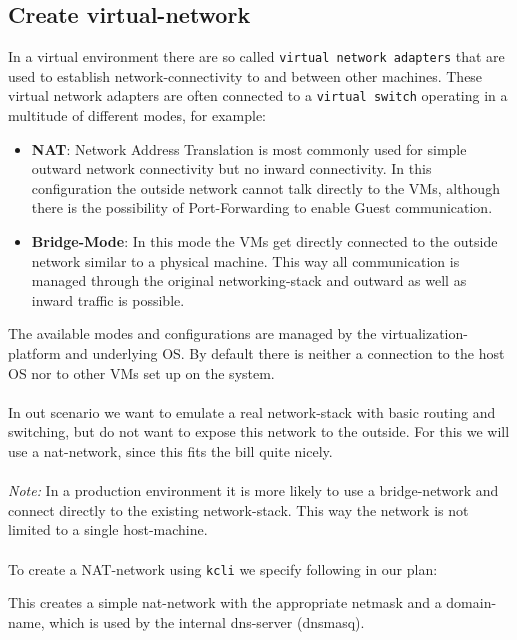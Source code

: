 \subsection{Create virtual-network}
In a virtual environment there are so called \texttt{virtual network adapters} that are used to establish network-connectivity to and between other machines. These virtual network adapters are often connected to a \texttt{virtual switch} operating in a multitude of different modes, for example:
\begin{itemize}
	\item \textbf{NAT}: Network Address Translation is most commonly used for simple outward network connectivity but no inward connectivity. In this configuration the outside network cannot talk directly to the VMs, although there is the possibility of Port-Forwarding to enable Guest communication.
	\item \textbf{Bridge-Mode}: In this mode the VMs get directly connected to the outside network similar to a physical machine. This way all communication is managed through the original networking-stack and outward as well as inward traffic is possible.
\end{itemize}
The available modes and configurations are managed by the virtualization-platform and underlying OS. By default there is neither a connection to the host OS nor to other VMs set up on the system. \cite{libvirt:2014}\\\\
In out scenario we want to emulate a real network-stack with basic routing and switching, but do not want to expose this network to the outside. For this we will use a nat-network, since this fits the bill quite nicely.\\\\
\textit{Note:} In a production environment it is more likely to use a bridge-network and connect directly to the existing network-stack. This way the network is not limited to a single host-machine.\\\\
To create a NAT-network using \texttt{kcli} we specify following in our plan:

This creates a simple nat-network with the appropriate netmask and a domain-name, which is used by the internal dns-server (dnsmasq).

